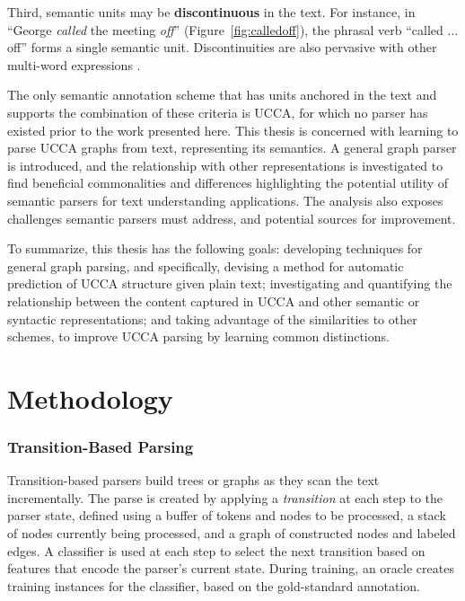 \documentclass[12pt,a4paper,table]{report}
\begin{document}
Third, semantic units may be \textbf{discontinuous} in the text. For instance, in
``George \textit{called} the meeting \textit{off}'' (Figure~\ref{fig:calledoff}),
the phrasal verb ``called ... off'' forms a single semantic unit.
Discontinuities are also pervasive with other multi-word
expressions \citep{schneider2014discriminative}.

The only semantic annotation scheme that has units anchored in the text and supports the combination of these criteria is UCCA,
for which no parser has existed prior to the work presented here.
This thesis is concerned with learning to parse UCCA graphs from text, representing its semantics.
A general graph parser is introduced,
and the relationship with other representations is investigated to find beneficial commonalities and
differences highlighting the potential utility of semantic parsers for text understanding applications.
The analysis also exposes challenges semantic parsers must address,
and potential sources for improvement.

To summarize, this thesis has the following goals:
developing techniques for general graph parsing, and
specifically, devising a method for automatic prediction of UCCA
    structure given plain text;
investigating and quantifying the relationship between the content
    captured in UCCA and other semantic or syntactic representations;
and taking advantage of the similarities to other schemes,
    to improve UCCA parsing by learning common distinctions.

\chapter{Methodology}

\subsection*{Transition-Based Parsing}

Transition-based parsers \citep{Nivre03anefficient} build trees or graphs
as they scan the text incrementally.
The parse is created by applying a \textit{transition} at each step to the parser state,
defined using a buffer of tokens and nodes to be processed,
a stack of nodes currently being processed,
and a graph of constructed nodes and labeled edges.
A classifier is used at each step to select the next transition based on features
that encode the parser's current state.
During training, an oracle creates training instances for the classifier,
based on the gold-standard annotation.
\end{document}
